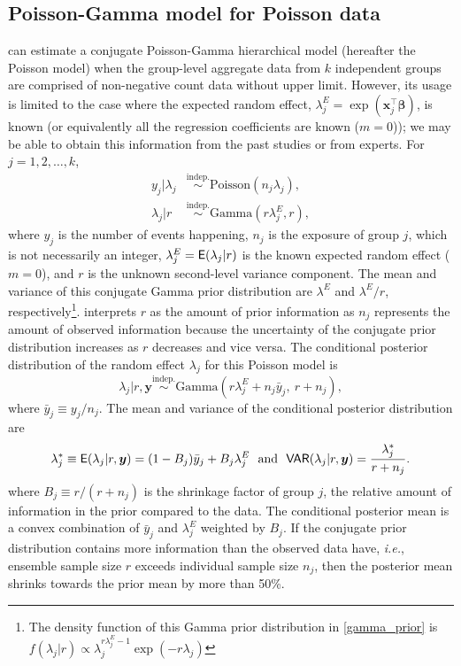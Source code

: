 \documentclass[article]{jss}
\begin{document}
\subsection[Poisson-Gamma]{Poisson-Gamma model for Poisson data}\label{poissonsubsec}
 can estimate a conjugate Poisson-Gamma hierarchical model (hereafter the Poisson model) when the group-level aggregate data from $k$ independent  groups are comprised of non-negative count data without upper limit. However, its usage is limited to the case where the expected random effect, $\lambda^E_j=\exp(\boldsymbol{x}_j^\top \boldsymbol{\beta})$,  is known  (or equivalently all the regression coefficients are known ($m=0$)); we may be able to obtain this information from the past studies or from experts. For $j=1, 2, \ldots, k$, 
\begin{align}
y_j\vert \lambda_j &\stackrel{\textrm{indep.}}{\sim}  \textrm{Poisson}(n_{j}\lambda_{j}),\\
\lambda_{j}\vert r &\stackrel{\textrm{indep.}}{\sim} \textrm{Gamma}(r\lambda^E_j, r),\label{gamma_prior}
\end{align}
where $y_j$ is the number of events happening, $n_{j}$ is the exposure of group $j$, which is not necessarily an integer, $\lambda^E_j=\mathsf{E}(\lambda_j\vert r)$ is the known expected random effect ($m=0$), and $r$ is the unknown second-level variance component. The mean and variance of this conjugate Gamma prior distribution are $\lambda^E$ and $\lambda^E/r$, respectively\footnote{The density function of this Gamma prior distribution in \eqref{gamma_prior} is $f(\lambda_j\vert r)\propto \lambda_j^{r\lambda^E_j - 1}\exp(-r\lambda_j)$}.     \cite{albert1988computational} interprets $r$ as the amount of prior information as $n_{j}$ represents the amount of observed information because the uncertainty of the conjugate prior distribution increases as $r$ decreases and vice versa. The conditional posterior distribution of the random effect $\lambda_j$ for this Poisson model is
\begin{equation} \label{gamma_post}
\lambda_j\vert r, \boldsymbol{y} \stackrel{\textrm{indep.}}{\sim}\textrm{Gamma}(r\lambda^E_j + n_j\bar{y}_{j},~ r + n_j),
\end{equation}  
where $\bar{y}_j\equiv y_j/n_j$. The mean and variance of the conditional posterior distribution are
\begin{equation}\label{gammapost_mean_var}
\lambda^\ast_j\equiv \mathsf{E}(\lambda_j\vert r, \boldsymbol{y} )=(1-B_{j})\bar{y}_{j} + B_{j}\lambda^E_j~~\textrm{and}~~\mathsf{VAR}(\lambda_j\vert r, \boldsymbol{y})=\frac{\lambda^\ast_j}{r+n_j}.
\end{equation}
where $B_{j}\equiv r / (r+n_{j})$ is the shrinkage factor of group $j$, the relative amount of information in the prior compared to the data. The conditional posterior mean is  a convex combination of $\bar{y}_{j}$ and  $\lambda^E_j$ weighted by $B_j$. If the conjugate prior distribution contains more information than the observed data have, \emph{i.e.}, ensemble sample size $r$ exceeds individual sample size $n_{j}$, then the posterior mean shrinks  towards the prior mean by more than 50\%.%
\end{document}
